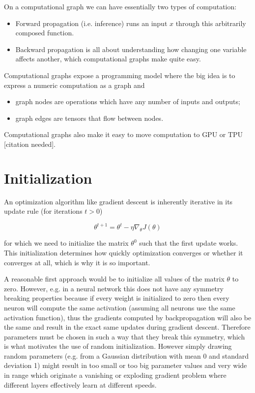 On a computational graph we can have essentially two types of computation:

\begin{itemize}
    \item Forward propagation (i.e. inference) runs an input $x$ through this arbitrarily composed function.
    \item Backward propagation is all about understanding how changing one variable affects another, which computational graphs make quite easy.
\end{itemize}

Computational graphs expose a programming model where the big idea is to express a numeric computation as a graph and

\begin{itemize}
    \item graph nodes are operations which have any number of inputs and outputs;
    \item graph edges are tensors that flow between nodes.
\end{itemize}

Computational graphs also make it easy to move computation to GPU or TPU [citation needed].

\section{Initialization}

An optimization algorithm like gradient descent is inherently iterative in its update rule (for iterations $t > 0$)

$$
\theta^{t+1} = \theta^t - \eta \nabla_{\theta} J(\theta)
$$

for which we need to initialize the matrix $\theta^0$ such that the first update works. This initialization determines how quickly optimization converges or whether it converges at all, which is why it is so important.

A reasonable first approach would be to initialize all values of the matrix $\theta$ to zero. However, e.g. in a neural network this does not have any symmetry breaking properties because if every weight is initialized to zero then every neuron will compute the same activation (assuming all neurons use the same activation function), thus the gradients computed by backpropagation will also be the same and result in the exact same updates during gradient descent. Therefore parameters must be chosen in such a way that they break this symmetry, which is what motivates the use of random initialization. However simply drawing random parameters (e.g. from a Gaussian distribution with mean 0 and standard deviation 1) might result in too small or too big parameter values and very wide in range which originate a vanishing or exploding gradient problem where different layers effectively learn at different speeds.

